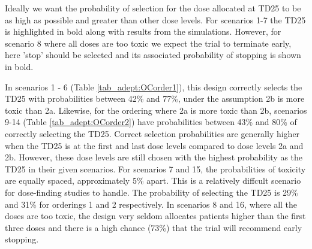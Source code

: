 Ideally we want the probability of selection for the dose allocated at TD25 to be as high as possible and greater than other dose levels. For scenarios 1-7 the TD25 is highlighted in bold along with results from the simulations. However, for scenario 8 where all doses are too toxic we expect the trial to terminate early, here 'stop' should be selected and its associated probability of stopping is shown in bold. 

In scenarios 1 - 6 (Table \ref{tab_adept:OCorder1}), this design correctly selects the TD25 with probabilities between 42\% and 77\%, under the assumption 2b is more toxic than 2a. Likewise, for the ordering where 2a is more toxic than 2b, scenarios 9-14 (Table \ref{tab_adept:OCorder2}) have probabilities between 43\% and 80\% of correctly selecting the TD25. Correct selection probabilities are generally higher when the TD25 is at the first and last dose levels compared to dose levels 2a and 2b. However, these dose levels are still chosen with the highest probability as the TD25 in their given scenarios. For scenarios 7 and 15, the probabilities of toxicity are equally spaced, approximately 5\% apart. This is a relatively diffcult scenario for dose-finding studies to handle. The probability of selecting the TD25 is 29\% and 31\% for orderings 1 and 2 respectively. In scenarios 8 and 16, where all the doses are too toxic, the design very seldom allocates patients higher than the first three doses and there is a high chance (73\%) that the trial will recommend early stopping.


